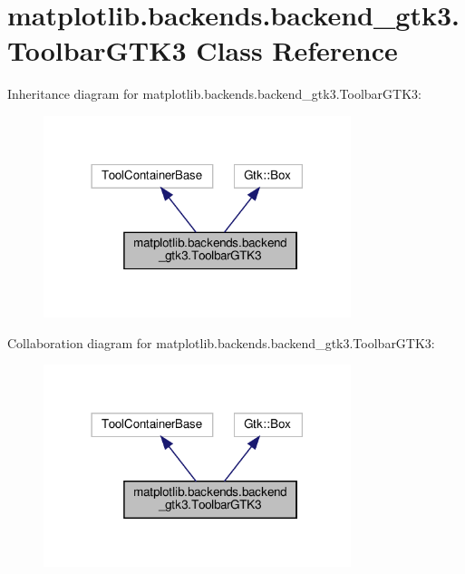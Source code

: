 \hypertarget{classmatplotlib_1_1backends_1_1backend__gtk3_1_1ToolbarGTK3}{}\section{matplotlib.\+backends.\+backend\+\_\+gtk3.\+Toolbar\+G\+T\+K3 Class Reference}
\label{classmatplotlib_1_1backends_1_1backend__gtk3_1_1ToolbarGTK3}


Inheritance diagram for matplotlib.\+backends.\+backend\+\_\+gtk3.\+Toolbar\+G\+T\+K3\+:
\nopagebreak
\begin{figure}[H]
\begin{center}
\leavevmode
\includegraphics[width=254pt]{classmatplotlib_1_1backends_1_1backend__gtk3_1_1ToolbarGTK3__inherit__graph}
\end{center}
\end{figure}


Collaboration diagram for matplotlib.\+backends.\+backend\+\_\+gtk3.\+Toolbar\+G\+T\+K3\+:
\nopagebreak
\begin{figure}[H]
\begin{center}
\leavevmode
\includegraphics[width=254pt]{classmatplotlib_1_1backends_1_1backend__gtk3_1_1ToolbarGTK3__coll__graph}
\end{center}
\end{figure}
